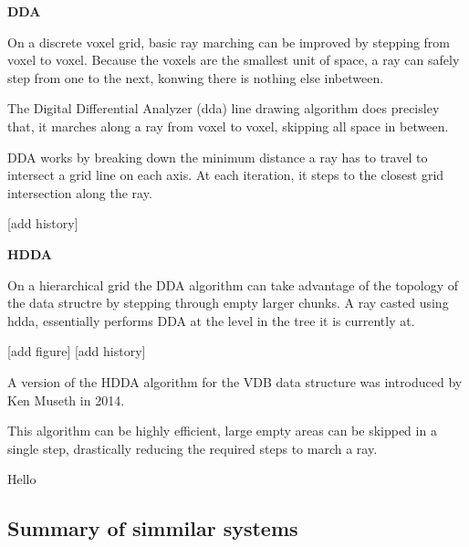 \vspace{0.5cm}
\label{def:dda}
\textbf{DDA}

On a discrete voxel grid, basic ray marching can be improved by stepping from voxel to voxel. Because the voxels are the smallest unit of space, a ray can safely step from one to the next, konwing there is nothing else inbetween.

The Digital Differential Analyzer (\acrshort{dda}) line drawing algorithm does precisley that, it marches along a ray from voxel to voxel, skipping all space in between.

DDA works by breaking down the minimum distance a ray has to travel to intersect a grid line on each axis.
At each iteration, it steps to the closest grid intersection along the ray.

[add history]

\vspace{0.5cm}
\label{def:hdda}
\textbf{HDDA}

On a hierarchical grid the DDA algorithm can take advantage of the topology of the data structre by stepping through empty larger chunks.
A ray casted using \acrshort{hdda}, essentially performs DDA at the level in the tree it is currently at.

[add figure]
[add history]

A version of the HDDA algorithm for the VDB data structure was introduced by Ken Museth in 2014\supercite{vdb2014}.

This algorithm can be highly efficient, large empty areas can be skipped in a single step, drastically reducing the required steps to march a ray.

Hello


\subsection{Summary of simmilar systems}
